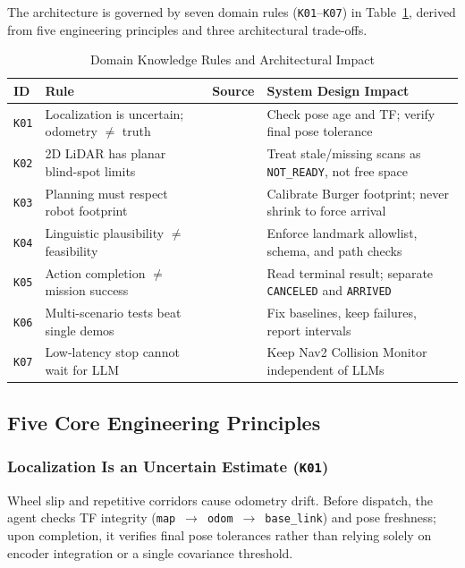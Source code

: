 \documentclass[conference,a4paper]{IEEEtran}
\begin{document}
The architecture is governed by seven domain rules (\texttt{K01}--\texttt{K07}) in Table~\ref{tab:domain_rules}, derived from five engineering principles and three architectural trade-offs.

\begin{table}[!t]
\caption{Domain Knowledge Rules and Architectural Impact}
\label{tab:domain_rules}
\centering
\scriptsize
\setlength{\tabcolsep}{3pt}
\begin{tabularx}{\columnwidth}{@{} >{\raggedright\arraybackslash}p{0.65cm} >{\raggedright\arraybackslash}p{2.45cm} >{\raggedright\arraybackslash}p{1.05cm} >{\raggedright\arraybackslash}X @{}}
\toprule
\textbf{ID} & \textbf{Rule} & \textbf{Source} & \textbf{System Design Impact} \\
\midrule
\texttt{K01} & Localization is uncertain; odometry $\neq$ truth & \cite{b4, b5} & Check pose age and TF; verify final pose tolerance \\
\texttt{K02} & 2D LiDAR has planar blind-spot limits & \cite{b8} & Treat stale/missing scans as \texttt{NOT\_READY}, not free space \\
\texttt{K03} & Planning must respect robot footprint & \cite{b9} & Calibrate Burger footprint; never shrink to force arrival \\
\texttt{K04} & Linguistic plausibility $\neq$ feasibility & \cite{b2} & Enforce landmark allowlist, schema, and path checks \\
\texttt{K05} & Action completion $\neq$ mission success & \cite{b10} & Read terminal result; separate \texttt{CANCELED} and \texttt{ARRIVED} \\
\texttt{K06} & Multi-scenario tests beat single demos & \cite{b6, b7, b12} & Fix baselines, keep failures, report intervals \\
\texttt{K07} & Low-latency stop cannot wait for LLM & \cite{b11} & Keep Nav2 Collision Monitor independent of LLMs \\
\bottomrule
\end{tabularx}
\end{table}

\subsection{Five Core Engineering Principles}

\subsubsection{Localization Is an Uncertain Estimate (\texttt{K01})}
Wheel slip and repetitive corridors cause odometry drift. Before dispatch, the agent checks TF integrity (\texttt{map}~$\rightarrow$~\texttt{odom}~$\rightarrow$~\texttt{base\_link}) and pose freshness; upon completion, it verifies final pose tolerances rather than relying solely on encoder integration or a single covariance threshold.
\end{document}
